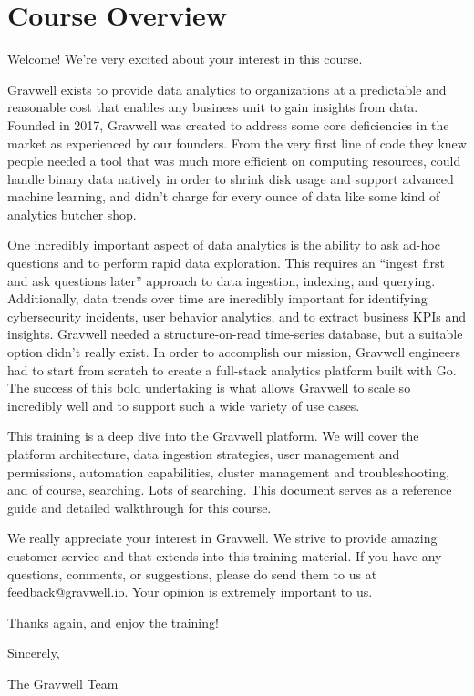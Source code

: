 \section*{Course Overview}

Welcome! We're very excited about your interest in this course.

Gravwell exists to provide data analytics to organizations at a
predictable and reasonable cost that enables any business unit to gain
insights from data. Founded in 2017, Gravwell was created to address
some core deficiencies in the market as experienced by our founders.
From the very first line of code they knew people needed a tool
that was much more efficient on computing resources, could handle binary
data natively in order to shrink disk usage and support advanced machine
learning, and didn't charge for every ounce of data like some kind of
analytics butcher shop.

One incredibly important aspect of data analytics is the ability to ask
ad-hoc questions and to perform rapid data exploration. This requires an
``ingest first and ask questions later'' approach to data ingestion,
indexing, and querying. Additionally, data trends over time are
incredibly important for identifying cybersecurity incidents, user
behavior analytics, and to extract business KPIs and insights. Gravwell
needed a structure-on-read time-series database, but a suitable option
didn't really exist. In order to accomplish our mission, Gravwell
engineers had to start from scratch to create a full-stack analytics
platform built with Go. The success of this bold undertaking is what
allows Gravwell to scale so incredibly well and to support such a wide
variety of use cases.

This training is a deep dive into the Gravwell platform. We will cover
the platform architecture, data ingestion strategies, user management
and permissions, automation capabilities, cluster management and
troubleshooting, and of course, searching. Lots of searching. This
document serves as a reference guide and detailed walkthrough for this
course.

We really appreciate your interest in Gravwell. We strive to provide
amazing customer service and that extends into this training material.
If you have any questions, comments, or suggestions, please do send them
to us at feedback@gravwell.io. Your opinion is extremely important
to us.

Thanks again, and enjoy the training!

Sincerely,


The Gravwell Team



